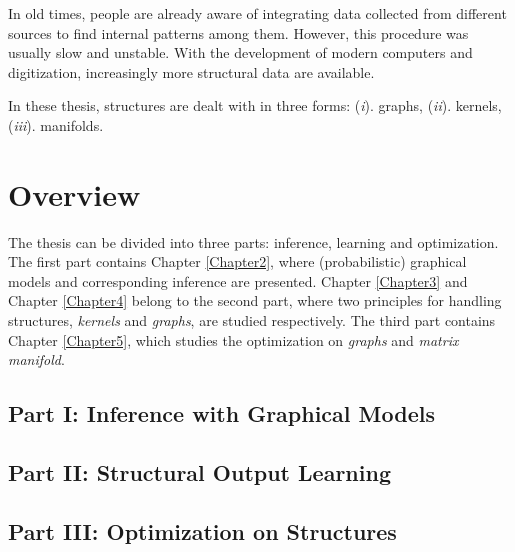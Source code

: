 In old times, people are already aware of integrating data collected from different sources to find internal patterns among them.     
However, this procedure was usually slow and unstable.  
With the development of modern computers and digitization, increasingly more structural data are available.   



In these thesis,  structures are dealt with in three forms: (\emph{i}). graphs, (\emph{ii}). kernels, (\emph{iii}). manifolds.    

\section{Overview}
\label{sec:overview}
The thesis can be divided into three parts: inference, learning and optimization. The first part contains Chapter \ref{Chapter2}, where (probabilistic) graphical models 
and corresponding inference are presented. Chapter \ref{Chapter3} and Chapter \ref{Chapter4} belong to the second part, where two principles
for handling structures, \emph{kernels} and \emph{graphs}, are studied respectively. The third part contains Chapter \ref{Chapter5}, which studies the optimization on 
\emph{graphs} and \emph{matrix manifold}.                    

\subsection{Part I: Inference with Graphical Models}

\subsection{Part II: Structural Output Learning}

\subsection{Part III: Optimization on Structures}

